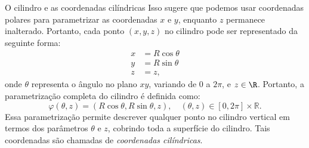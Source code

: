 \begin{example}{O cilindro e as coordenadas cilíndricas}{}
Isso sugere que podemos usar coordenadas polares para parametrizar as coordenadas \(x\) e \(y\), enquanto \(z\) permanece inalterado. Portanto, cada ponto \((x, y, z)\) no cilindro pode ser representado da seguinte forma:
\begin{align*}
x &= R\cos\theta \\
y &= R\sin\theta \\
z &= z,
\end{align*}
onde  \(\theta\) representa o ângulo no plano \(xy\), variando de \(0\) a \(2\pi\), e \(z\in\R\). Portanto, a parametrização completa do cilindro é definida como:
\[
\varphi(\theta, z) = \left(R\cos\theta, R\sin\theta, z\right), \quad (\theta, z) \in [0, 2\pi] \times \mathbb{R}.
\]
Essa parametrização permite descrever qualquer ponto no cilindro vertical em termos dos parâmetros \(\theta\) e \(z\), cobrindo toda a superfície do cilindro. Tais coordenadas são chamadas de \textit{coordenadas cilíndricas}. 


\end{example}


